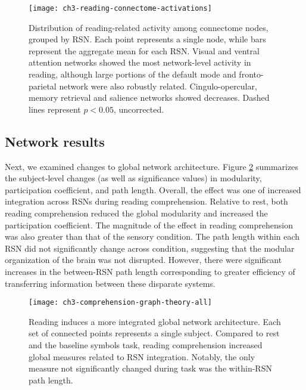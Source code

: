 \begin{figure}[t]
	\centering
	\texttt{[image: ch3-reading-connectome-activations]}
    \caption[Distribution of reading-related activity among RSN nodes]{Distribution of reading-related activity among connectome nodes, grouped by RSN. Each point represents a single node, while bars represent the aggregate mean for each RSN. Visual and ventral attention networks showed the most network-level activity in reading, although large portions of the default mode and fronto-parietal network were also robustly related. Cingulo-opercular, memory retrieval and salience networks showed decreases. Dashed lines represent $p < 0.05$, uncorrected.}
	\label{fig:ch3-reading-connectome-activations}
\end{figure}


\subsection{Network results}

Next, we examined changes to global network architecture. Figure \ref{fig:ch3-comprehension-graph-theory-all} summarizes the subject-level changes (as well as significance values) in modularity, participation coefficient, and path length. Overall, the effect was one of increased integration across RSNs during reading comprehension. Relative to rest, both reading comprehension reduced the global modularity and increased the participation coefficient. The magnitude of the effect in reading comprehension was also greater than that of the sensory condition. The path length within each RSN did not significantly change across condition, suggesting that the modular organization of the brain was not disrupted.  However, there were significant increases in the between-RSN path length corresponding to greater efficiency of transferring information between these disparate systems.

\begin{figure}[t!]
	\centering
	\texttt{[image: ch3-comprehension-graph-theory-all]}
    \caption[Reading induces a more integrated global network architecture]{Reading induces a more integrated global network architecture. Each set of connected points represents a single subject. Compared to rest and the baseline symbols task, reading comprehension increased global measures related to RSN integration. Notably, the only measure not significantly changed during task was the within-RSN path length.}
	\label{fig:ch3-comprehension-graph-theory-all}
\end{figure}

